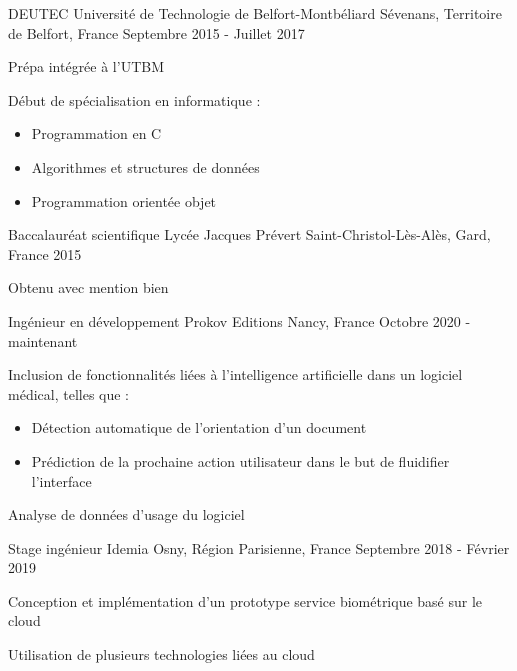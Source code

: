 \documentclass[12pt, a4paper]{awesome-cv}
\begin{document}
\begin{cventries}
  \cventry
  {DEUTEC}
  {Université de Technologie de Belfort-Montbéliard}
  {Sévenans, Territoire de Belfort, France}
  {Septembre 2015 - Juillet 2017}
  {
    \begin{cvitems}
      \item Prépa intégrée à l'UTBM
      \item Début de spécialisation en informatique :
        \begin{itemize}
          \item Programmation en C
          \item Algorithmes et structures de données
          \item Programmation orientée objet
        \end{itemize}
    \end{cvitems}
  }

  \cventry
  {Baccalauréat scientifique}
  {Lycée Jacques Prévert}
  {Saint-Christol-Lès-Alès, Gard, France}
  {2015}
  {
    \begin{cvitems}
      \item Obtenu avec mention bien
    \end{cvitems}
  }

  
\end{cventries}



\begin{cventries}

  \cventry
  {Ingénieur en développement}
  {Prokov Editions}
  {Nancy, France}
  {Octobre 2020 - maintenant}
  {
    \begin{cvitems}
      \item Inclusion de fonctionnalités liées à l'intelligence artificielle dans un logiciel médical, telles que :
      \begin{itemize}
        \item Détection automatique de l'orientation d'un document
        \item Prédiction de la prochaine action utilisateur dans le but de fluidifier l'interface
      \end{itemize}
      \item Analyse de données d'usage du logiciel
    \end{cvitems}
  }

  \cventry
  {Stage ingénieur}
  {Idemia}
  {Osny, Région Parisienne, France}
  {Septembre 2018 - Février 2019}
  {
    \begin{cvitems}
      \item Conception et implémentation d'un prototype service biométrique basé sur le cloud
      \item Utilisation de plusieurs technologies liées au cloud
    \end{cvitems}
  }

\end{cventries}
\end{document}
